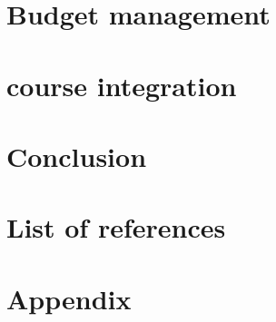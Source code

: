 \documentclass{article}
\begin{document}
\section{Budget management}

\section{course integration}

\section{Conclusion}

\section{List of references}

\section{Appendix}
\end{document}
